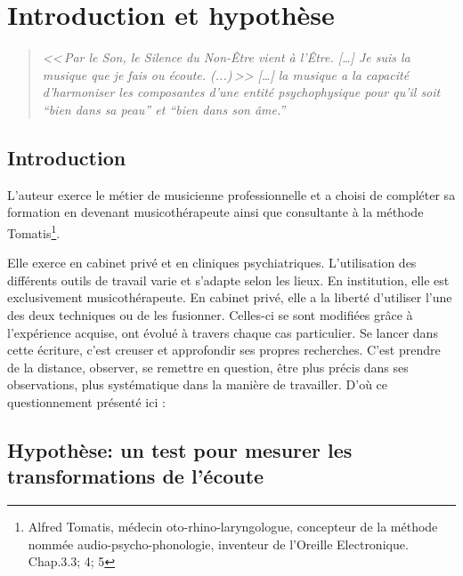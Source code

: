 \chapter{Introduction et hypothèse}
\begin{quotation}
\emph{<<\,\emph{Par le Son, le Silence du Non-Être vient à l'Être}. [\ldots] \textsl{Je suis}
\emph{la musique que je fais ou écoute}. (...)\,>>
[\ldots] \emph{la musique a la capacité d'harmoniser
les composantes d'une entité psychophysique pour qu'il soit ``bien
dans sa peau'' et ``bien dans son âme.}''}\, \autocite[ch. 1,  p. 8]{viret:b}
\end{quotation}

\section{Introduction}

L'auteur exerce le métier de musicienne professionnelle et a  choisi de compléter sa formation en devenant musicothérapeute  ainsi que consultante à la méthode Tomatis\footnote{Alfred Tomatis, médecin oto-rhino-laryngologue, concepteur de la méthode nommée audio-psycho-phonologie, inventeur de l'Oreille Electronique. Chap.3.3; 4; 5}.  



Elle exerce en cabinet privé et en cliniques psychiatriques. L'utilisation des différents outils de travail varie et s'adapte selon les lieux. En institution, elle est exclusivement musicothérapeute. En cabinet
privé, elle a la liberté d'utiliser l'une des deux techniques ou de les fusionner. Celles-ci se sont modifiées grâce à  l'expérience acquise, ont évolué  
à travers chaque cas particulier.
 Se lancer dans cette écriture, c'est creuser et approfondir ses propres recherches. C'est prendre de la distance, observer, se remettre en question, être plus précis dans ses observations, plus systématique dans la manière de travailler. D'où ce questionnement présenté ici : 


\section{Hypothèse: un test pour mesurer les transformations de l'écoute}

